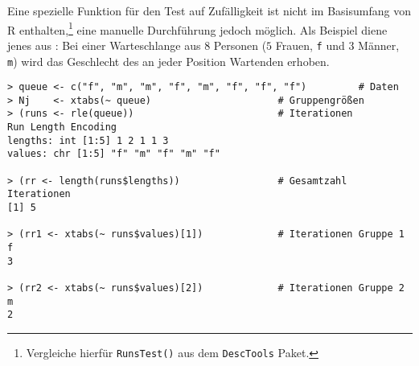 Eine spezielle Funktion für den Test auf Zufälligkeit ist nicht im Basisumfang von R enthalten,\footnote{Vergleiche hierfür \lstinline!RunsTest()! aus dem \lstinline!DescTools! Paket.} eine manuelle Durchführung jedoch möglich. Als Beispiel diene jenes aus : Bei einer Warteschlange aus $8$ Personen ($5$ Frauen, \lstinline!f! und $3$ Männer, \lstinline!m!) wird das Geschlecht des an jeder Position Wartenden erhoben.
\begin{lstlisting}
> queue <- c("f", "m", "m", "f", "m", "f", "f", "f")         # Daten
> Nj    <- xtabs(~ queue)                      # Gruppengrößen
> (runs <- rle(queue))                         # Iterationen
Run Length Encoding
lengths: int [1:5] 1 2 1 1 3
values: chr [1:5] "f" "m" "f" "m" "f"

> (rr <- length(runs$lengths))                 # Gesamtzahl Iterationen
[1] 5

> (rr1 <- xtabs(~ runs$values)[1])             # Iterationen Gruppe 1
f
3

> (rr2 <- xtabs(~ runs$values)[2])             # Iterationen Gruppe 2
m
2
\end{lstlisting}

